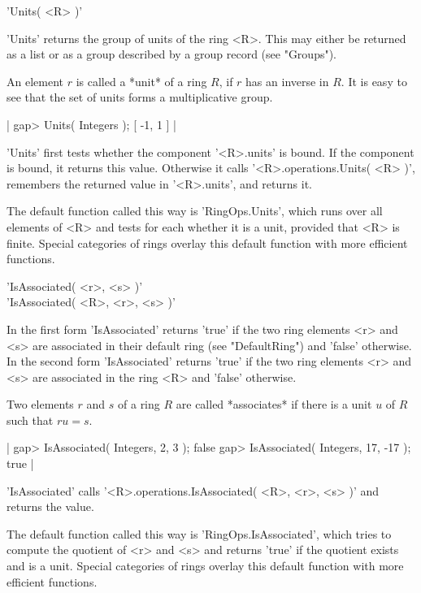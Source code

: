 
'Units( <R> )'

'Units' returns the group of units of the  ring <R>.   This may either be
returned as a   list  or as  a  group   described by a group record  (see
"Groups").

An element $r$ is called a *unit* of a ring $R$, if $r$ has an inverse in
$R$.   It is easy  to  see that the  set of  units forms a multiplicative
group.

|    gap> Units( Integers );
    [ -1, 1 ] |

'Units' first  tests whether the component '<R>.units' is bound.   If the
component  is  bound,  it   returns  this  value.   Otherwise  it   calls
'<R>.operations.Units(  <R>   )',   remembers   the  returned  value   in
'<R>.units', and returns it.

The default function called this  way is 'RingOps.Units', which runs over
all elements  of  <R> and tests for each whether it is a  unit,  provided
that <R> is  finite.  Special  categories  of rings overlay this  default
function with more efficient functions.


'IsAssociated( <r>, <s> )' \\
'IsAssociated( <R>, <r>, <s> )'

In the first form 'IsAssociated' returns 'true' if the  two ring elements
<r> and <s> are associated in their default ring  (see "DefaultRing") and
'false' otherwise.   In the second form  'IsAssociated' returns 'true' if
the two ring  elements <r> and <s> are   associated  in the ring <R>  and
'false' otherwise.

Two elements  $r$ and $s$ of a ring $R$  are called *associates* if there
is a unit $u$ of $R$ such that $r u = s$.

|    gap> IsAssociated( Integers, 2, 3 );
    false
    gap> IsAssociated( Integers, 17, -17 );
    true |

'IsAssociated' calls '<R>.operations.IsAssociated( <R>,  <r>, <s>  )' and
returns the value.

The default  function  called this  way  is 'RingOps.IsAssociated', which
tries to compute  the quotient of  <r> and <s> and  returns 'true' if the
quotient exists and is a unit.  Special categories of  rings overlay this
default function with more efficient functions.


